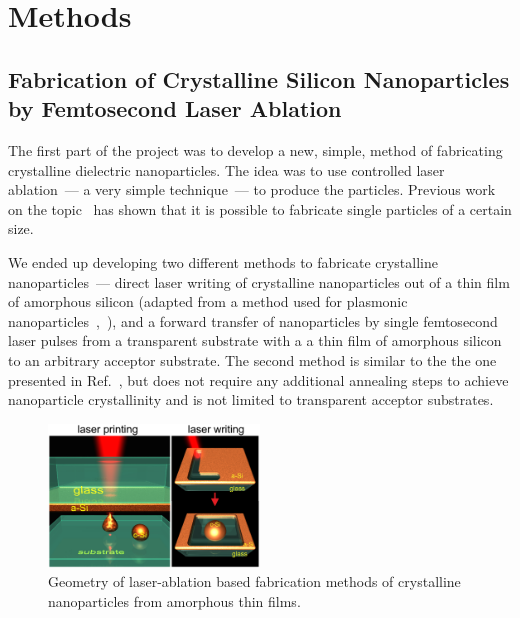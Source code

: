 \section{Methods}
\label{ch:Exp}

    \subsection{Fabrication of Crystalline Silicon Nanoparticles by Femtosecond Laser Ablation}
    \label{sec:Ablation}
            The first part of the project was to develop a new, simple, method of fabricating crystalline dielectric
        nanoparticles. The idea was to use controlled laser ablation~--- a very simple technique~--- to produce the particles.
        Previous work on the topic~\cite{kuznetsov2012magnetic, zywietz2014laser} has shown that it is possible to fabricate single particles
        of a certain size.

            We ended up developing two different methods to fabricate crystalline nanoparticles~--- direct laser writing of crystalline
        nanoparticles out of a thin film of amorphous silicon (adapted from a method used for plasmonic nanoparticles~\cite{makarov2016controllable},~), and a forward transfer of nanoparticles by single femtosecond laser pulses
        from a transparent substrate with a a thin film of amorphous silicon to an arbitrary acceptor substrate. The second method is
        similar to the the one presented in Ref.~\cite{zywietz2014laser}, but does not require any additional annealing steps to achieve
        nanoparticle crystallinity and is not limited to transparent acceptor substrates.

        \begin{figure}[h!]
                \begin{center}
                    \includegraphics[width=0.5\textwidth]{figs/methods/LaserPrinting.eps}
                \end{center}
                \caption{Geometry of laser-ablation based fabrication methods of crystalline nanoparticles from amorphous
                            thin films.}
                \label{fig:LaserPrinting}
        \end{figure}

